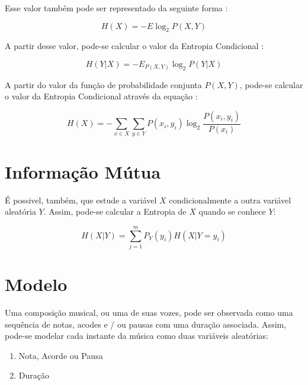 Esse valor também pode ser representado da seguinte forma \cite{livro}:

\begin{equation}
    H(X) = - E \log_2{P(X, Y)}
\end{equation}

A partir desse valor, pode-se calcular o valor da Entropia Condicional \cite{livro}:

\begin{equation}
    H(Y|X) = - E_{P(X,Y)} \log_2{P(Y|X)}
\end{equation}

A partir do valor da função de probabilidade conjunta $P(X,Y)$, pode-se calcular o valor da Entropia Condicional através da equação \cite{livro}:

\begin{equation}
    H(X) = - \sum_{x \in X}\sum_{y \in Y} P(x_i, y_i) \log_2{\frac{P(x_i, y_i)}{P(x_i)}}
\end{equation}





\section{Informação Mútua}

É possivel, também, que estude a variável $X$ condicionalmente a outra variável aleatória $Y$. Assim, pode-se calcular a Entropia de $X$ quando se conhece $Y$:

\begin{equation}
    H(X|Y) =  \sum_{j=1}^{m} P_Y(y_i) H(X|Y = y_i)
\end{equation}


\section{Modelo}

Uma composição musical, ou uma de suas vozes, pode ser observada como uma sequência de notas, acodes e / ou pausas com uma duração associada. Assim, pode-se modelar cada instante da música como duas variáveis aleatórias:

\begin{enumerate}
    \item Nota, Acorde ou Pausa
    \item Duração
\end{enumerate}

